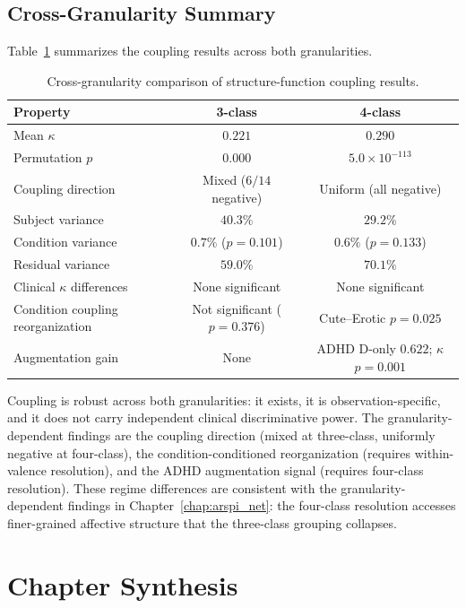 \subsection{Cross-Granularity Summary}

Table~\ref{tab:ch7_cross_granularity} summarizes the coupling results across both granularities.

\begin{table}[H]
\centering
\caption{Cross-granularity comparison of structure-function coupling results.}
\label{tab:ch7_cross_granularity}
\small
\begin{tabular}{lcc}
\hline
\textbf{Property} & \textbf{3-class} & \textbf{4-class} \\
\hline
Mean $\kappa$ & $0.221$ & $0.290$ \\
Permutation $p$ & $0.000$ & $5.0 \times 10^{-113}$ \\
Coupling direction & Mixed ($6/14$ negative) & Uniform (all negative) \\
Subject variance & $40.3\%$ & $29.2\%$ \\
Condition variance & $0.7\%$ ($p = 0.101$) & $0.6\%$ ($p = 0.133$) \\
Residual variance & $59.0\%$ & $70.1\%$ \\
Clinical $\kappa$ differences & None significant & None significant \\
Condition coupling reorganization & Not significant ($p = 0.376$) & Cute--Erotic $p = 0.025$ \\
Augmentation gain & None & ADHD D-only $0.622$; $\kappa$ $p = 0.001$ \\
\hline
\end{tabular}
\end{table}

Coupling is robust across both granularities: it exists, it is observation-specific, and it does not carry independent clinical discriminative power. The granularity-dependent findings are the coupling direction (mixed at three-class, uniformly negative at four-class), the condition-conditioned reorganization (requires within-valence resolution), and the ADHD augmentation signal (requires four-class resolution). These regime differences are consistent with the granularity-dependent findings in Chapter~\ref{chap:arspi_net}: the four-class resolution accesses finer-grained affective structure that the three-class grouping collapses.


\section{Chapter Synthesis}
\label{sec:ch7_synthesis}

